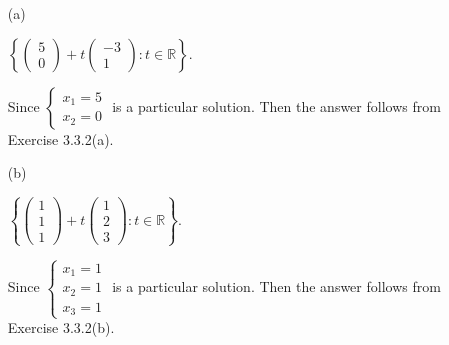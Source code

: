 \begin{Exercise}
\begin{enumerate}[(a)]
\item[(a)]
\begin{answer}
$\left\{\begin{pmatrix}
5 \\
0
\end{pmatrix} + t\begin{pmatrix}
-3 \\
1
\end{pmatrix} : t\in \mathbb{R} \right\}$.
\end{answer}
\begin{solution}
Since $\begin{cases}
x_1 = 5 \\
x_2 = 0
\end{cases}$ is a particular solution. Then the answer follows from Exercise 3.3.2(a).
\end{solution}

\item[(b)]
\begin{answer}
$\left\{\begin{pmatrix}
1 \\
1 \\
1
\end{pmatrix} + t\begin{pmatrix}
1 \\
2 \\
3
\end{pmatrix} : t\in \mathbb{R} \right\}$.
\end{answer}
\begin{solution}
Since $\begin{cases}
x_1 = 1 \\
x_2 = 1 \\
x_3 = 1
\end{cases}$ is a particular solution. Then the answer follows from Exercise 3.3.2(b).
\end{solution}

\end{enumerate}
\end{Exercise}